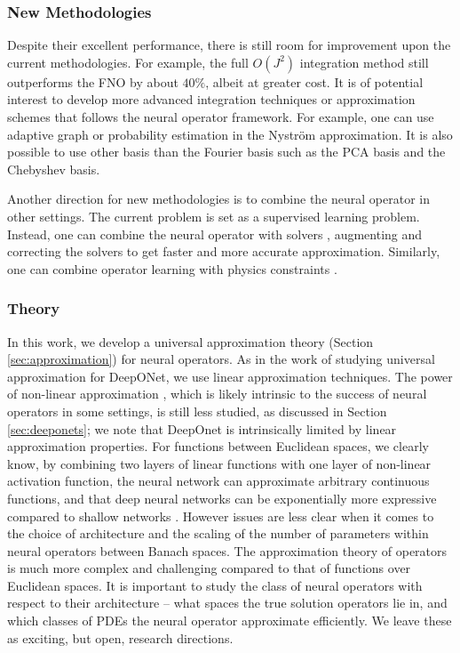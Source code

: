 \subsubsection{New Methodologies}
Despite their excellent performance, there is still room for improvement upon the current methodologies. For example, the full $O(J^2)$ integration method still outperforms the FNO by about $40\%$,
albeit at greater cost. It is of potential interest to develop more advanced integration techniques or approximation schemes that follows the neural operator framework. For example, one can use adaptive graph or probability estimation in the Nystr\"om approximation. It is also possible to use other basis than the Fourier basis such as the PCA basis and the Chebyshev basis. 

Another direction for new methodologies is to combine the neural operator in other settings. The current problem is set as a supervised learning problem. Instead, one can combine the neural operator with solvers \citep{pathak2020using, um2020solverintheloop}, augmenting and correcting the solvers to get faster and more accurate approximation. Similarly, one can combine operator learning with physics constraints \citep{wang2021learning,li2021physics}.

\subsubsection{Theory}
In this work, we develop a universal approximation theory (Section \ref{sec:approximation})
for neural operators. As in the work of \cite{lu2019deeponet} studying universal
approximation for DeepONet, we use linear approximation techniques. The power of 
non-linear approximation \citep{devore1998nonlinear}, which is likely intrinsic 
to the success of neural operators in some settings, is still less studied, as discussed in Section \ref{sec:deeponets}; we note that DeepOnet is intrinsically limited by linear
approximation properties. 
For functions between Euclidean spaces, we clearly know, by combining two layers of linear functions with one layer of non-linear activation function, the neural network can approximate arbitrary continuous functions, and that deep neural networks can be exponentially more expressive compared to shallow networks \citep{poole2016exponential}. However issues are less clear when it comes to the choice of architecture and the scaling of the number of parameters within neural operators between Banach spaces.
The approximation theory of operators is much more complex and challenging compared to that of functions over Euclidean spaces. It is important to study the class of neural operators with respect to their architecture -- what spaces the true solution operators lie in, and which classes of PDEs the neural operator approximate efficiently. We leave these as exciting, but
open, research directions. 

